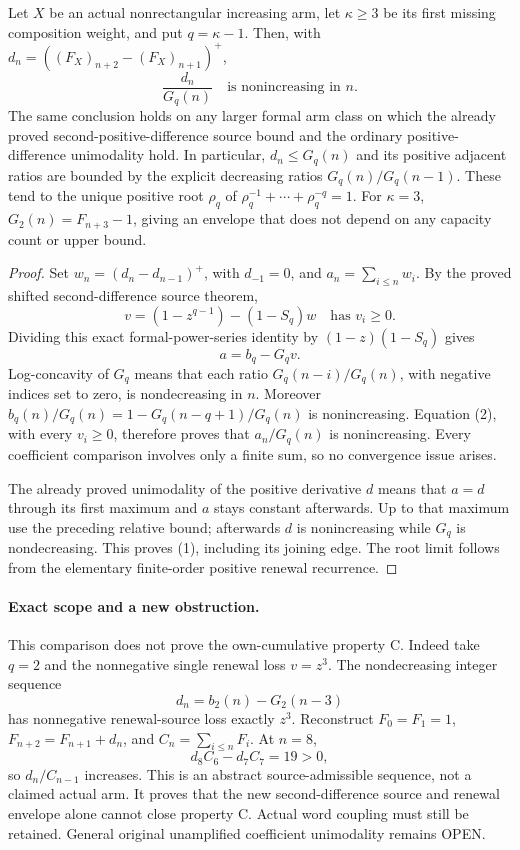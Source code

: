 \begin{theorem}
Let $X$ be an actual nonrectangular increasing arm, let
$\kappa\ge3$ be its first missing composition weight, and put
$q=\kappa-1$. Then, with
$d_n=((F_X)_{n+2}-(F_X)_{n+1})^+$,
\[
                         \frac{d_n}{G_q(n)}
                    \quad\text{is nonincreasing in }n.       \tag{1}
\]
The same conclusion holds on any larger formal arm class on which
the already proved second-positive-difference source bound and
the ordinary positive-difference unimodality hold.
In particular, $d_n\le G_q(n)$ and its positive adjacent ratios
are bounded by the explicit decreasing ratios $G_q(n)/G_q(n-1)$.
These tend to the unique positive root $\rho_q$ of
$\rho_q^{-1}+\cdots+\rho_q^{-q}=1$.
For $\kappa=3$, $G_2(n)=F_{n+3}-1$, giving an envelope that does
not depend on any capacity count or upper bound.
\end{theorem}
\begin{proof}
Set $w_n=(d_n-d_{n-1})^+$, with $d_{-1}=0$, and
$a_n=\sum_{i\le n}w_i$. By the proved shifted second-difference
source theorem,
\[
            v=(1-z^{q-1})-(1-S_q)w\quad\text{has }v_i\ge0.
\]
Dividing this exact formal-power-series identity by
$(1-z)(1-S_q)$ gives
\[
                      a=b_q-G_qv.                            \tag{2}
\]
Log-concavity of $G_q$ means that each ratio
$G_q(n-i)/G_q(n)$, with negative indices set to zero, is
nondecreasing in $n$. Moreover
$b_q(n)/G_q(n)=1-G_q(n-q+1)/G_q(n)$ is nonincreasing.
Equation (2), with every $v_i\ge0$, therefore proves that
$a_n/G_q(n)$ is nonincreasing. Every coefficient comparison
involves only a finite sum, so no convergence issue arises.

The already proved unimodality of the positive derivative $d$
means that $a=d$ through its first maximum and $a$ stays constant
afterwards. Up to that maximum use the preceding relative bound;
afterwards $d$ is nonincreasing while $G_q$ is nondecreasing.
This proves (1), including its joining edge. The root limit follows
from the elementary finite-order positive renewal recurrence.
\end{proof}

\paragraph{Exact scope and a new obstruction.}
This comparison does not prove the own-cumulative property C.
Indeed take $q=2$ and the nonnegative single renewal loss $v=z^3$.
The nondecreasing integer sequence
\[
       d_n=b_2(n)-G_2(n-3)
\]
has nonnegative renewal-source loss exactly $z^3$. Reconstruct
$F_0=F_1=1$, $F_{n+2}=F_{n+1}+d_n$, and $C_n=\sum_{i\le n}F_i$.
At $n=8$,
\[
                    d_8C_6-d_7C_7=19>0,
\]
so $d_n/C_{n-1}$ increases. This is an abstract source-admissible
sequence, not a claimed actual arm. It proves that the new
second-difference source and renewal envelope alone cannot close
property C. Actual word coupling must still be retained.
General original unamplified coefficient unimodality remains OPEN.
